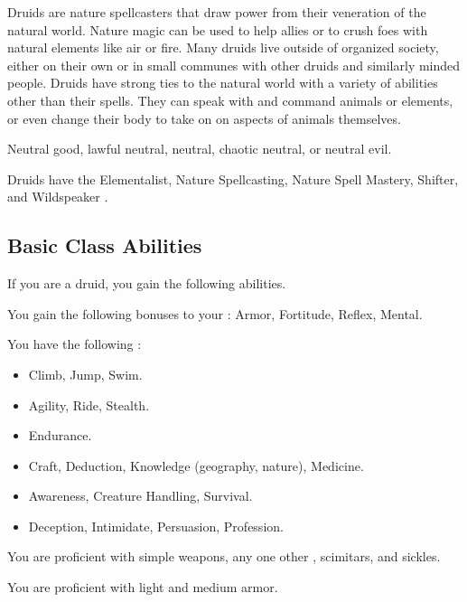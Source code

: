     Druids are nature spellcasters that draw power from their veneration of the natural world.
    Nature magic can be used to help allies or to crush foes with natural elements like air or fire.
    Many druids live outside of organized society, either on their own or in small communes with other druids and similarly minded people.
    Druids have strong ties to the natural world with a variety of abilities other than their spells.
    They can speak with and command animals or elements, or even change their body to take on on aspects of animals themselves.

     Neutral good, lawful neutral, neutral, chaotic neutral, or neutral evil.

     Druids have the Elementalist, Nature Spellcasting, Nature Spell Mastery, Shifter, and Wildspeaker .

    \subsection{Basic Class Abilities}
        If you are a druid, you gain the following abilities.

        You gain the following bonuses to your :  Armor,  Fortitude,  Reflex,  Mental.

        You have the following :
        \begin{itemize}
            \item {} Climb, Jump, Swim.
            \item {} Agility, Ride, Stealth.
            \item {} Endurance.
            \item {} Craft, Deduction, Knowledge (geography, nature), Medicine.
            \item {} Awareness, Creature Handling, Survival.
            \item {} Deception, Intimidate, Persuasion, Profession.
        \end{itemize}

        You are proficient with simple weapons, any one other , scimitars, and sickles.

        You are proficient with light and medium armor.

